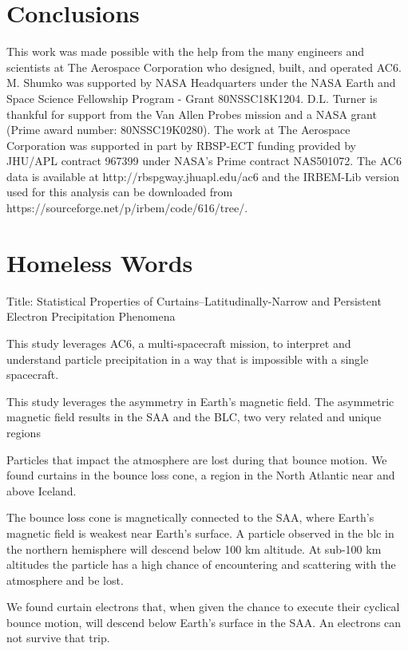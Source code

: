 \documentclass[draft]{agujournal2019}
\begin{document}
\section{Conclusions}


\acknowledgments
This work was made possible with the help from the many engineers and scientists at The Aerospace Corporation who designed, built, and operated AC6. M. Shumko was supported by NASA Headquarters under the NASA Earth and Space Science Fellowship Program - Grant 80NSSC18K1204. D.L. Turner is thankful for support from the Van Allen Probes mission and a NASA grant (Prime award number: 80NSSC19K0280). The work at The Aerospace Corporation was supported in part by RBSP-ECT funding provided by JHU/APL contract 967399 under NASA's Prime contract NAS501072. The AC6 data is available at http://rbspgway.jhuapl.edu/ac6 and the IRBEM-Lib version used for this analysis can be downloaded from https://sourceforge.net/p/irbem/code/616/tree/.

\section{Homeless Words}

Title: Statistical Properties of Curtains--Latitudinally-Narrow and Persistent Electron Precipitation Phenomena

This study leverages AC6, a multi-spacecraft mission, to interpret and understand particle precipitation in a way that is impossible with a single spacecraft.

This study leverages the asymmetry in Earth's magnetic field. The asymmetric magnetic field results in the SAA and the BLC, two very related and unique regions

Particles that impact the atmosphere are lost during that bounce motion. We found curtains in the bounce loss cone, a region in the North Atlantic near and above Iceland.

The bounce loss cone is magnetically connected to the SAA, where Earth's magnetic field is weakest near Earth's surface. A particle observed in the blc in the northern hemisphere will descend below 100 km altitude. At sub-100 km altitudes the particle has a high chance of encountering and scattering with the atmosphere and be lost. 

We found curtain electrons that, when given the chance to execute their cyclical bounce motion, will descend below Earth's surface in the SAA. An electrons can not survive that trip.
\end{document}
